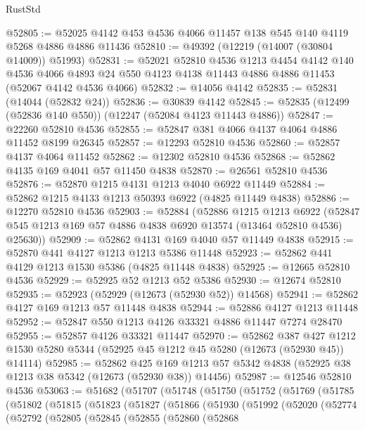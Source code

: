 \begin{lexlean}{RustStd}
\begin{coremodule}
{\begin{coremodule}
{{{{{{{{{{{{{{{{{{{{{{{{{{{{{{{{{{{{{{{{{{{{{{{{{{{{{{{{{{{{{{{{{{{{{{{{{{{{{{{{@52805 := @52025 @4142 @453 @4536 @4066 @11457 @138 @545 @140 @4119 @5268 @4886 @4886 @11436
@52810 := @49392 (@12219 (@14007 (@30804 @14009)) @51993)
@52831 := @52021
    @52810
    @4536
    @1213
    @4454
    @4142
    @140
    @4536
    @4066
    @4893
    @24
    @550
    @4123
    @4138
    @11443
    @4886
    @4886
    @11453
    (@52067 @4142 @4536 @4066)
@52832 := @14056 @4142
@52835 := @52831 (@14044 (@52832 @24))
@52836 := @30839 @4142
@52845 := @52835 (@12499 (@52836 @140 @550)) (@12247 (@52084 @4123 @11443 @4886))
@52847 := @22260 @52810 @4536
@52855 := @52847 @381 @4066 @4137 @4064 @4886 @11452 @8199 @26345
@52857 := @12293 @52810 @4536
@52860 := @52857 @4137 @4064 @11452
@52862 := @12302 @52810 @4536
@52868 := @52862 @4135 @169 @4041 @57 @11450 @4838
@52870 := @26561 @52810 @4536
@52876 := @52870 @1215 @4131 @1213 @4040 @6922 @11449
@52884 := @52862 @1215 @4133 @1213 @50393 @6922 (@4825 @11449 @4838)
@52886 := @12270 @52810 @4536
@52903 := @52884
    (@52886
      @1215
      @1213
      @6922
      (@52847 @545 @1213 @169 @57 @4886 @4838 @6920 @13574 (@13464 @52810 @4536) @25630))
@52909 := @52862 @4131 @169 @4040 @57 @11449 @4838
@52915 := @52870 @441 @4127 @1213 @1213 @5386 @11448
@52923 := @52862 @441 @4129 @1213 @1530 @5386 (@4825 @11448 @4838)
@52925 := @12665 @52810 @4536
@52929 := @52925 @52 @1213 @52 @5386
@52930 := @12674 @52810
@52935 := @52923 (@52929 (@12673 (@52930 @52)) @14568)
@52941 := @52862 @4127 @169 @1213 @57 @11448 @4838
@52944 := @52886 @4127 @1213 @11448
@52952 := @52847 @550 @1213 @4126 @33321 @4886 @11447 @7274 @28470
@52955 := @52857 @4126 @33321 @11447
@52970 := @52862
    @387
    @427
    @1212
    @1530
    @5280
    @5344
    (@52925 @45 @1212 @45 @5280 (@12673 (@52930 @45)) @14114)
@52985 := @52862
    @425
    @169
    @1213
    @57
    @5342
    @4838
    (@52925 @38 @1213 @38 @5342 (@12673 (@52930 @38)) @14456)
@52987 := @12546 @52810 @4536
@53063 := @51682
    (@51707
      (@51748
        (@51750
          (@51752
            (@51769
              (@51785
                (@51802
                  (@51815
                    (@51823
                      (@51827
                        (@51866
                          (@51930
                            (@51992
                              (@52020
                                (@52774
                                  (@52792
                                    (@52805
                                      (@52845
                                        (@52855
                                          (@52860
                                            (@52868
}}}}}}}}}}}}}}}}}}}}}}}}}}}}}}}}}}}}}}}}}}}}}}}}}}}}}}}}}}}}}}}}}}}}}}}}}}}}}}}}
\end{coremodule}}
\end{coremodule}
\end{lexlean}
